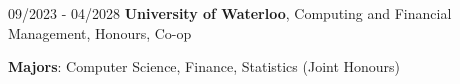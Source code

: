 
\begin{twocolentry}{09/2023 - 04/2028}
    \textbf{University of Waterloo}, Computing and Financial Management, Honours, Co-op
\end{twocolentry}
\begin{onecolentry}
\textbf{Majors}: Computer Science, Finance, Statistics (Joint Honours) \\
\end{onecolentry}